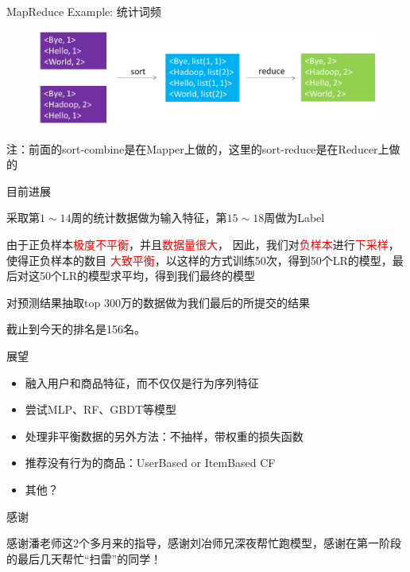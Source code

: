 \documentclass{beamer}
\begin{document}
\begin{frame}{MapReduce Example: 统计词频}

\begin{figure}
\includegraphics[width=\linewidth]{./WordCount_reduce}
\end{figure}

注：前面的sort-combine是在Mapper上做的，这里的sort-reduce是在Reducer上做的

\end{frame}

\begin{frame}{目前进展}

采取第$1 \sim 14$周的统计数据做为输入特征，第$15 \sim 18$周做为Label

\vspace{1em}

由于正负样本\textcolor{red}{极度不平衡}，并且\textcolor{red}{数据量很大}，
因此，我们对\textcolor{red}{负样本}进行\textcolor{red}{下采样}，使得正负样本的数目
\textcolor{red}{大致平衡}，以这样的方式训练50次，得到50个LR的模型，最后对这50个LR的模型求平均，得到我们最终的模型

\vspace{1em}

对预测结果抽取top 300万的数据做为我们最后的所提交的结果

\vspace{1em}

截止到今天的排名是156名。

\end{frame}

\begin{frame}{展望}

\begin{itemize}
\item 融入用户和商品特征，而不仅仅是行为序列特征
\item 尝试MLP、RF、GBDT等模型
\item 处理非平衡数据的另外方法：不抽样，带权重的损失函数
\item 推荐没有行为的商品：UserBased or ItemBased CF
\item 其他？
\end{itemize}

\end{frame}

\begin{frame}{感谢}

感谢潘老师这2个多月来的指导，感谢刘冶师兄深夜帮忙跑模型，感谢在第一阶段的最后几天帮忙“扫雷”的同学！

\end{frame}
\end{document}
